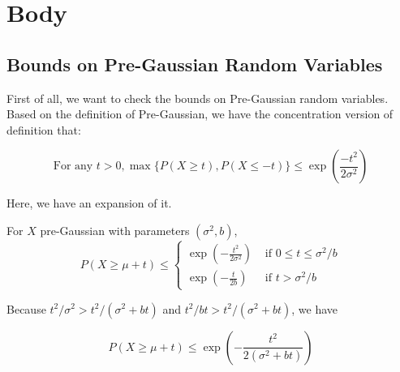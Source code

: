 

\section{Body}

\subsection{Bounds on Pre-Gaussian Random Variables}
First of all, we want to check the bounds on Pre-Gaussian random variables.
Based on the definition of Pre-Gaussian, we have the concentration version of definition that:

\begin{equation}
  \text{For any } t>0, \max \{P(X \geq t), P(X \leq -t) \} \leq \exp(\frac{-t^2}{2 \sigma^2})
\end{equation}

Here, we have an expansion of it.

\begin{theorem} \cite*{Bartlett:2020}
  For $X$ pre-Gaussian with parameters $(\sigma^2, b)$,
  \begin{equation}
    P(X \geq \mu+t) \leq\left\{\begin{array}{ll}
    \exp \left(-\frac{t^{2}}{2 \sigma^{2}}\right) & \text { if } 0 \leq t \leq \sigma^{2} / b \\
    \exp \left(-\frac{t}{2 b}\right) & \text { if } t>\sigma^{2} / b
    \end{array}\right.
  \end{equation}
\end{theorem}

Because $t^2/ \sigma^2 > t^2/ (\sigma^2 + bt)$ and $t^2/ bt > t^2/ (\sigma^2 + bt)$, we have

\begin{equation}
  P(X \geq \mu+t) \leq 
  \exp \left(-\frac{t^{2}}{2 (\sigma^2 + bt)}\right) 
\end{equation}

